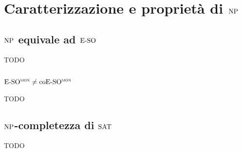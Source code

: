 \chapter{Caratterizzazione e proprietà di $\NP$}

\section{$\NP$ equivale ad $\ESO$}

TODO


\section{$\ESOmon \neq \coESOmon$}

TODO


\section{$\NP$-completezza di $\SAT$}

TODO

